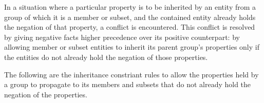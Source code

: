 \documentclass[10pt, twocolumn]{article}
\begin{document}
            In a situation where a particular property is to be inherited by
            an entity from a group of which it is a member or subset, and the
            contained entity already holds the negation of that property, a
            conflict is encountered. This conflict is resolved by giving
            negative facts higher precedence over its positive counterpart:
            by allowing member or subset entities to inherit its parent group's
            properties only if the entities do not already hold the negation of
            those properties.

            The following are the inheritance constriant rules to allow the
            properties held by a group to propagate to its members and
            subsets that do not already hold the negation of the properties.
\end{document}
